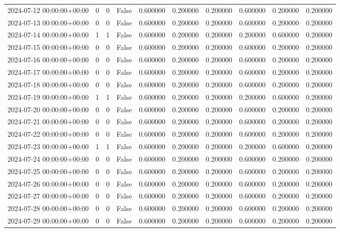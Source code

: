 \begin{tabular}{lrrrrrrrrr}
2024-07-12 00:00:00+00:00 & 0 & 0 & False & 0.600000 & 0.200000 & 0.200000 & 0.600000 & 0.200000 & 0.200000 \\
2024-07-13 00:00:00+00:00 & 0 & 0 & False & 0.600000 & 0.200000 & 0.200000 & 0.600000 & 0.200000 & 0.200000 \\
2024-07-14 00:00:00+00:00 & 1 & 1 & False & 0.600000 & 0.200000 & 0.200000 & 0.200000 & 0.600000 & 0.200000 \\
2024-07-15 00:00:00+00:00 & 0 & 0 & False & 0.600000 & 0.200000 & 0.200000 & 0.600000 & 0.200000 & 0.200000 \\
2024-07-16 00:00:00+00:00 & 0 & 0 & False & 0.600000 & 0.200000 & 0.200000 & 0.600000 & 0.200000 & 0.200000 \\
2024-07-17 00:00:00+00:00 & 0 & 0 & False & 0.600000 & 0.200000 & 0.200000 & 0.600000 & 0.200000 & 0.200000 \\
2024-07-18 00:00:00+00:00 & 0 & 0 & False & 0.600000 & 0.200000 & 0.200000 & 0.600000 & 0.200000 & 0.200000 \\
2024-07-19 00:00:00+00:00 & 1 & 1 & False & 0.600000 & 0.200000 & 0.200000 & 0.200000 & 0.600000 & 0.200000 \\
2024-07-20 00:00:00+00:00 & 0 & 0 & False & 0.600000 & 0.200000 & 0.200000 & 0.600000 & 0.200000 & 0.200000 \\
2024-07-21 00:00:00+00:00 & 0 & 0 & False & 0.600000 & 0.200000 & 0.200000 & 0.600000 & 0.200000 & 0.200000 \\
2024-07-22 00:00:00+00:00 & 0 & 0 & False & 0.600000 & 0.200000 & 0.200000 & 0.600000 & 0.200000 & 0.200000 \\
2024-07-23 00:00:00+00:00 & 1 & 1 & False & 0.600000 & 0.200000 & 0.200000 & 0.200000 & 0.600000 & 0.200000 \\
2024-07-24 00:00:00+00:00 & 0 & 0 & False & 0.600000 & 0.200000 & 0.200000 & 0.600000 & 0.200000 & 0.200000 \\
2024-07-25 00:00:00+00:00 & 0 & 0 & False & 0.600000 & 0.200000 & 0.200000 & 0.600000 & 0.200000 & 0.200000 \\
2024-07-26 00:00:00+00:00 & 0 & 0 & False & 0.600000 & 0.200000 & 0.200000 & 0.600000 & 0.200000 & 0.200000 \\
2024-07-27 00:00:00+00:00 & 0 & 0 & False & 0.600000 & 0.200000 & 0.200000 & 0.600000 & 0.200000 & 0.200000 \\
2024-07-28 00:00:00+00:00 & 0 & 0 & False & 0.600000 & 0.200000 & 0.200000 & 0.600000 & 0.200000 & 0.200000 \\
2024-07-29 00:00:00+00:00 & 0 & 0 & False & 0.600000 & 0.200000 & 0.200000 & 0.600000 & 0.200000 & 0.200000 \\

\end{tabular}
